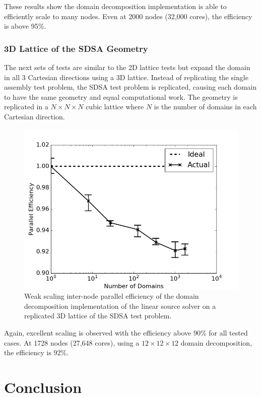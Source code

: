 These results show the domain decomposition implementation is able to efficiently scale to many nodes. Even at 2000 nodes (32,000 cores), the efficiency is above 95\%.

\subsubsection{3D Lattice of the SDSA Geometry}

The next sets of tests are similar to the 2D lattice tests but expand the domain in all 3 Cartesian directions using a 3D lattice. Instead of replicating the single assembly test problem, the SDSA test problem is replicated, causing each domain to have the same geometry and equal computational work. The geometry is replicated in a $N \times N \times N$ cubic lattice where $N$ is the number of domains in each Cartesian direction.

\begin{figure}[h!]
	\centering
	\includegraphics[width=0.6\linewidth]{figures/DD/dd-ws-3D.png}
	\caption[]{Weak scaling inter-node parallel efficiency of the domain decomposition implementation of the linear source solver on a replicated 3D lattice of the SDSA test problem.}
	\label{fig:dd-ws-3D}
\end{figure}

Again, excellent scaling is observed with the efficiency above 90\% for all tested cases. At 1728 nodes (27,648 cores), using a $12 \times 12 \times 12$ domain decomposition, the efficiency is 92\%.

\newpage
\section{Conclusion}

